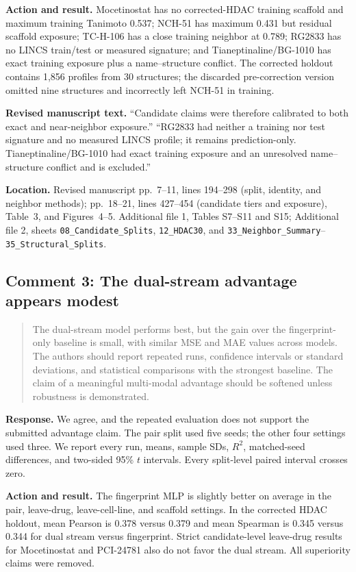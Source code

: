 \documentclass[10pt]{article}
\newenvironment{reviewcomment}{%
  \begin{quote}\small\itshape\color{black}
}{\end{quote}}
\newcommand{\Response}{\textbf{Response.} }
\newcommand{\Action}{\textbf{Action and result.} }
\newcommand{\RevisedText}{\textbf{Revised manuscript text.} }
\newcommand{\Location}{\textbf{Location.} }
\newcommand{\qtext}[1]{``#1''}
\begin{document}
\Action Mocetinostat has no corrected-HDAC training scaffold and maximum training Tanimoto 0.537; NCH-51 has maximum 0.431 but residual scaffold exposure; TC-H-106 has a close training neighbor at 0.789; RG2833 has no LINCS train/test or measured signature; and Tianeptinaline/BG-1010 has exact training exposure plus a name--structure conflict. The corrected holdout contains 1,856 profiles from 30 structures; the discarded pre-correction version omitted nine structures and incorrectly left NCH-51 in training.

\RevisedText \qtext{Candidate claims were therefore calibrated to both exact and near-neighbor exposure.} \qtext{RG2833 had neither a training nor test signature and no measured LINCS profile; it remains prediction-only. Tianeptinaline/BG-1010 had exact training exposure and an unresolved name--structure conflict and is excluded.}

\Location Revised manuscript pp.~7--11, lines 194--298 (split, identity, and neighbor methods); pp.~18--21, lines 427--454 (candidate tiers and exposure), Table~3, and Figures~4--5. Additional file 1, Tables S7--S11 and S15; Additional file 2, sheets \texttt{08\_Candidate\_Splits}, \texttt{12\_HDAC30}, and \texttt{33\_Neighbor\_Summary}--\texttt{35\_Structural\_Splits}.

\subsection*{Comment 3: The dual-stream advantage appears modest}
\begin{reviewcomment}
The dual-stream model performs best, but the gain over the fingerprint-only baseline is small, with similar MSE and MAE values across models. The authors should report repeated runs, confidence intervals or standard deviations, and statistical comparisons with the strongest baseline. The claim of a meaningful multi-modal advantage should be softened unless robustness is demonstrated.
\end{reviewcomment}

\Response We agree, and the repeated evaluation does not support the submitted advantage claim. The pair split used five seeds; the other four settings used three. We report every run, means, sample SDs, $R^2$, matched-seed differences, and two-sided 95\% $t$ intervals. Every split-level paired interval crosses zero.

\Action The fingerprint MLP is slightly better on average in the pair, leave-drug, leave-cell-line, and scaffold settings. In the corrected HDAC holdout, mean Pearson is 0.378 versus 0.379 and mean Spearman is 0.345 versus 0.344 for dual stream versus fingerprint. Strict candidate-level leave-drug results for Mocetinostat and PCI-24781 also do not favor the dual stream. All superiority claims were removed.
\end{document}
